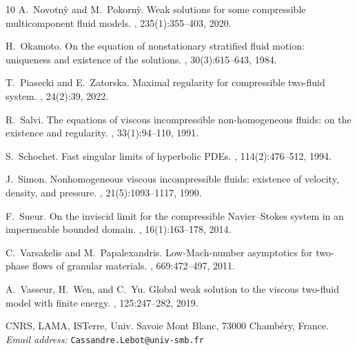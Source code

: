\documentclass[11pt, twoside, a4paper]{article}
\makeatletter
\theoremstyle{plain}
\theoremstyle{remark}
\numberwithin{equation}{section}
\def\adrese{
\noindent CNRS, LAMA, ISTerre, Univ. Savoie Mont Blanc, 73000 Chamb\'ery, France.\\
{\it Email address:} \texttt{Cassandre.Lebot@univ-smb.fr}
}
\makeatother
\begin{document}
\begin{thebibliography}{10}
A.~Novotn{\`y} and M.~Pokorn{\`y}.
\newblock Weak solutions for some compressible multicomponent fluid models.
, 235(1):355--403, 2020.

H.~Okamoto.
\newblock On the equation of nonstationary stratified fluid motion: uniqueness
  and existence of the solutions.
, 30(3):615--643, 1984.

T.~Piasecki and E.~Zatorska.
\newblock Maximal regularity for compressible two-fluid system.
, 24(2):39, 2022.

R.~Salvi.
\newblock The equations of viscous incompressible non-homogeneous fluids: on
  the existence and regularity.
, 33(1):94--110, 1991.

S.~Schochet.
\newblock Fast singular limits of hyperbolic {PDE}s.
, 114(2):476--512, 1994.

J.~Simon.
\newblock Nonhomogeneous viscous incompressible fluids: existence of velocity,
  density, and pressure.
, 21(5):1093--1117, 1990.

F.~Sueur.
\newblock On the inviscid limit for the compressible {N}avier--{S}tokes system
  in an impermeable bounded domain.
, 16(1):163--178, 2014.

C.~Varsakelis and M.~Papalexandris.
\newblock Low-{M}ach-number asymptotics for two-phase flows of granular
  materials.
, 669:472--497, 2011.

A.~Vasseur, H.~Wen, and C.~Yu.
\newblock Global weak solution to the viscous two-fluid model with finite
  energy.
, 125:247--282, 2019.

\end{thebibliography}


%
%

\adrese{}
\end{document}
